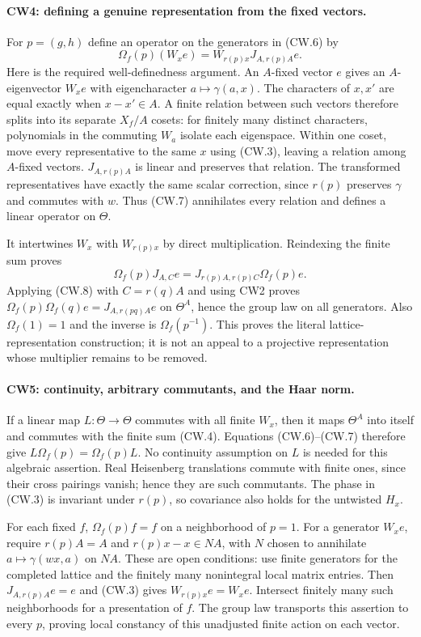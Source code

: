 \paragraph{CW4: defining a genuine representation from the fixed vectors.}
For $p=(g,h)$ define an operator on the generators in (CW.6) by
\[
       \Omega_f(p)(W_xe)=W_{r(p)x}J_{A,r(p)A}e .          \tag{CW.7}
\]
Here is the required well-definedness argument.  An $A$-fixed vector
$e$ gives an $A$-eigenvector $W_xe$ with eigencharacter
$a\mapsto\gamma(a,x)$.  The characters of $x,x'$ are equal exactly
when $x-x'\in A$.  A finite relation between such vectors therefore
splits into its separate $X_f/A$ cosets: for finitely many distinct
characters, polynomials in the commuting $W_a$ isolate each
eigenspace.  Within one coset, move every representative to the same
$x$ using (CW.3), leaving a relation among $A$-fixed vectors.
$J_{A,r(p)A}$ is linear and preserves that relation.  The transformed
representatives have exactly the same scalar correction, since
$r(p)$ preserves $\gamma$ and commutes with $w$.  Thus (CW.7)
annihilates every relation and defines a linear operator on $\Theta$.

It intertwines $W_x$ with $W_{r(p)x}$ by direct multiplication.
Reindexing the finite sum proves
\[
 \Omega_f(p)J_{A,C}e
       =J_{r(p)A,r(p)C}\Omega_f(p)e .                  \tag{CW.8}
\]
Applying (CW.8) with $C=r(q)A$ and using CW2 proves
$\Omega_f(p)\Omega_f(q)e=J_{A,r(pq)A}e$ on $\Theta^A$,
hence the group law on all generators.  Also
$\Omega_f(1)=1$ and the inverse is $\Omega_f(p^{-1})$.
This proves the literal lattice-representation construction; it is
not an appeal to a projective representation whose multiplier remains
to be removed.

\paragraph{CW5: continuity, arbitrary commutants, and the Haar norm.}
If a linear map $L:\Theta\to\Theta$ commutes with all finite $W_x$,
then it maps $\Theta^A$ into itself and commutes with the finite sum
(CW.4).  Equations (CW.6)--(CW.7) therefore give
$L\Omega_f(p)=\Omega_f(p)L$.  No continuity assumption on $L$ is
needed for this algebraic assertion.  Real Heisenberg translations
commute with finite ones, since their cross pairings vanish; hence
they are such commutants.  The phase in (CW.3) is invariant under
$r(p)$, so covariance also holds for the untwisted $H_x$.

For each fixed $f$, $\Omega_f(p)f=f$ on a neighborhood of $p=1$.
For a generator $W_xe$, require $r(p)A=A$ and
$r(p)x-x\in NA$, with $N$ chosen to annihilate
$a\mapsto\gamma(wx,a)$ on $NA$.  These are open conditions:
use finite generators for the completed lattice and the finitely
many nonintegral local matrix entries.  Then $J_{A,r(p)A}e=e$ and
(CW.3) gives $W_{r(p)x}e=W_xe$.  Intersect finitely many such
neighborhoods for a presentation of $f$.  The group law transports
this assertion to every $p$, proving local constancy of this
unadjusted finite action on each vector.

